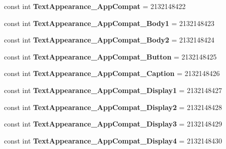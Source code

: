 \begin{DoxyCompactItemize}
const int {\bfseries Text\+Appearance\+\_\+\+App\+Compat} = 2132148422
\item 
\mbox{\label{classst_delivery_1_1_resource_1_1_style_adafd5e441f43a26024b8d777b3445c1f}} 
const int {\bfseries Text\+Appearance\+\_\+\+App\+Compat\+\_\+\+Body1} = 2132148423
\item 
\mbox{\label{classst_delivery_1_1_resource_1_1_style_a312b98af5dbdc959cbff59deecf48523}} 
const int {\bfseries Text\+Appearance\+\_\+\+App\+Compat\+\_\+\+Body2} = 2132148424
\item 
\mbox{\label{classst_delivery_1_1_resource_1_1_style_ab6fde1e5495da9056f3f78d0c3fd44fd}} 
const int {\bfseries Text\+Appearance\+\_\+\+App\+Compat\+\_\+\+Button} = 2132148425
\item 
\mbox{\label{classst_delivery_1_1_resource_1_1_style_a9136ce84dabd84a6f8c4904257a82e20}} 
const int {\bfseries Text\+Appearance\+\_\+\+App\+Compat\+\_\+\+Caption} = 2132148426
\item 
\mbox{\label{classst_delivery_1_1_resource_1_1_style_ae83bc3323909d33dfb5d851a24cae8be}} 
const int {\bfseries Text\+Appearance\+\_\+\+App\+Compat\+\_\+\+Display1} = 2132148427
\item 
\mbox{\label{classst_delivery_1_1_resource_1_1_style_a7c3c2ab032f4fd38f3f876da00eb6560}} 
const int {\bfseries Text\+Appearance\+\_\+\+App\+Compat\+\_\+\+Display2} = 2132148428
\item 
\mbox{\label{classst_delivery_1_1_resource_1_1_style_ac0dae1400a03bb74fbd73afbd95af6d8}} 
const int {\bfseries Text\+Appearance\+\_\+\+App\+Compat\+\_\+\+Display3} = 2132148429
\item 
\mbox{\label{classst_delivery_1_1_resource_1_1_style_aa10c27e245200db6718bd1a2cf8fdca5}} 
const int {\bfseries Text\+Appearance\+\_\+\+App\+Compat\+\_\+\+Display4} = 2132148430
\item 
\mbox{\label{classst_delivery_1_1_resource_1_1_style_a381745f061b90d72d9af1deddd52bcb3}} 

\end{DoxyCompactItemize}
